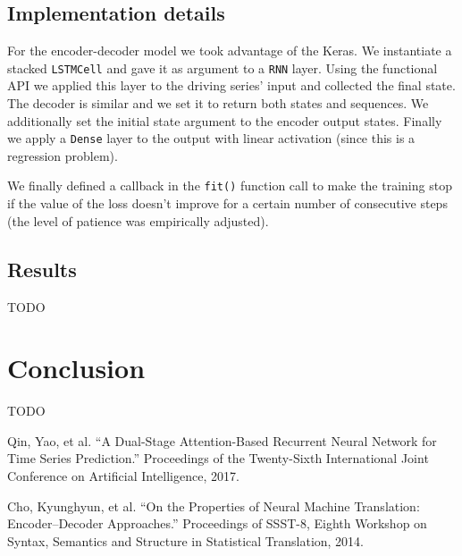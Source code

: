 \documentclass{article}
\begin{document}
\subsection{Implementation details}

For the encoder-decoder model we took advantage of the Keras. We instantiate a stacked 
\texttt{LSTMCell} and gave it as argument to a \texttt{RNN} layer. Using the 
functional API we applied this layer to the driving series' input and collected
the final state. The decoder is similar and we set it to return both states and 
sequences. We additionally set the initial state argument to the encoder output 
states. Finally we apply a \texttt{Dense} layer to the output with linear 
activation (since this is a regression problem).

We finally defined a callback in the \texttt{fit()} function call to make the
training stop if the value of the loss doesn't improve for a certain number of 
consecutive steps (the level of patience was empirically adjusted).

\subsection{Results}
TODO

\section{Conclusion}

TODO

\newpage
\begin{thebibliography}{9}
Qin, Yao, et al. “A Dual-Stage Attention-Based Recurrent Neural Network for Time Series Prediction.” Proceedings of the Twenty-Sixth International Joint Conference on Artificial Intelligence, 2017.

Cho, Kyunghyun, et al. “On the Properties of Neural Machine Translation: Encoder–Decoder Approaches.” Proceedings of SSST-8, Eighth Workshop on Syntax, Semantics and Structure in Statistical Translation, 2014.


\end{thebibliography}
\end{document}
